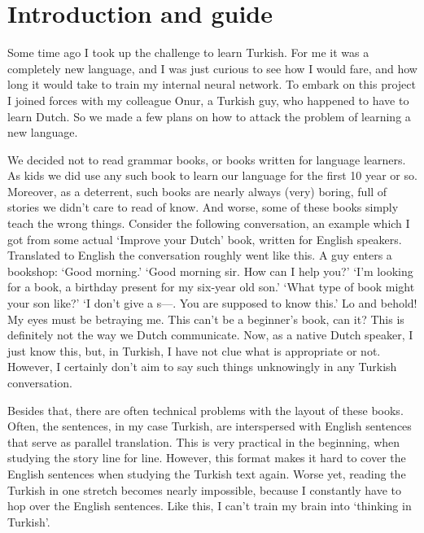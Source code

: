 
\section{Introduction and guide}
\label{sec:introduction-guide}

Some time ago I took up the challenge to learn Turkish. For me it was a completely new language, and I was just curious to see how I would fare, and how long it would take to train my internal neural network. To embark on this project I joined forces with my colleague Onur, a Turkish guy, who happened to have to learn Dutch. So we made a few plans on how to attack the problem of learning a new language.

We decided not to read grammar books, or books written for language learners. As kids we did use any such book to learn our language for the first 10 year or so. Moreover, as a deterrent, such books are nearly always (very) boring, full of stories we didn't care to read of know. And worse, some of these books simply teach the wrong things. Consider the following  conversation, an example which I got from some actual `Improve your Dutch' book, written for English speakers. Translated to English the conversation roughly went like this. A guy enters a bookshop: `Good morning.' `Good morning sir. How can I help you?' `I'm looking for a book, a birthday present for  my six-year old son.' `What type of book might your son like?' `I don't give a s---. You are supposed to know this.' Lo and behold! My eyes must  be betraying me. This can't be a beginner's book, can it? This is definitely not the way we Dutch communicate. Now, as a native Dutch speaker, I  just know  this, but, in Turkish, I have not clue what is appropriate or not. However, I certainly don't aim to say such things unknowingly  in any Turkish conversation. 


Besides that, there are often technical problems with the layout of these books. Often, the sentences, in my case Turkish, are interspersed with  English sentences that serve as parallel translation. This is very practical in the beginning, when studying the story line for line. However,  this format makes it hard to cover the English sentences when studying the Turkish text again. Worse yet,  reading the Turkish in one stretch becomes nearly impossible, because I  constantly have to hop over the English sentences. Like this, I can't train my brain into `thinking in Turkish'. 

